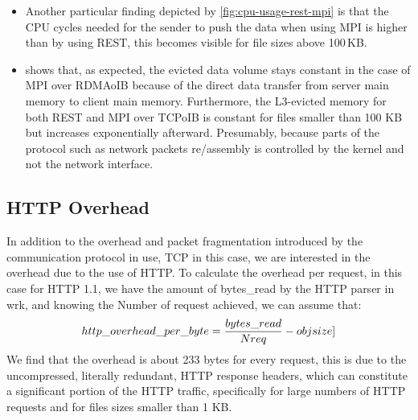 \documentclass[runningheads]{llncs}
\begin{document}
\begin{itemize}
\item Another particular finding depicted by \cref{fig:cpu-usage-rest-mpi} is that the CPU cycles needed for the sender to push the data when using MPI is higher than by using REST, this becomes visible for file sizes above 100\,KB.
\item {} shows that, as expected, the evicted data volume stays constant in the case of MPI over RDMAoIB because of the direct data transfer from server main memory to client main memory. Furthermore, the L3-evicted memory for both REST and MPI over TCPoIB is constant for files smaller than 100 KB but increases exponentially afterward. Presumably, because parts of the protocol such as network packets re/assembly is controlled by the kernel and not the network interface.
\end{itemize}

\subsection{HTTP Overhead}
In addition to the overhead and packet fragmentation introduced by the communication protocol in use, TCP in this case, we are interested in the overhead due to the use of HTTP. To calculate the overhead per request, in this case for HTTP 1.1, we have the amount of bytes\_read by the HTTP parser in wrk, and knowing the Number of request achieved, we can assume that:
\[http\_overhead\_per\_byte=\frac{bytes\_read}{Nreq} - obj\-size]\]
We find that the overhead is about 233 bytes for every request, this is due to the uncompressed, literally redundant, HTTP response headers, which can constitute a significant portion of the HTTP traffic, specifically for large numbers of HTTP requests and for files sizes smaller than 1 KB.
\end{document}
